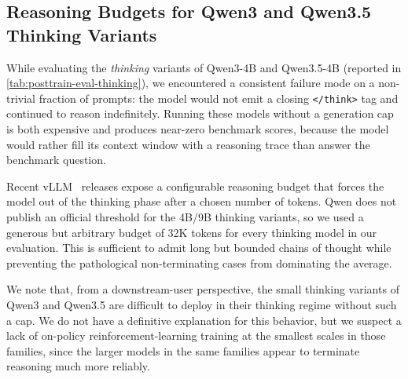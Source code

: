 \documentclass[11pt,a4paper]{article}
\begin{document}
\subsection{Reasoning Budgets for Qwen3 and Qwen3.5 Thinking Variants}
\label{app:qwen-thinking-budget}

While evaluating the \emph{thinking} variants of Qwen3-4B and Qwen3.5-4B
(reported in \cref{tab:posttrain-eval-thinking}), we encountered a
consistent failure mode on a non-trivial fraction of prompts: the model
would not emit a closing \texttt{</think>} tag and continued to reason
indefinitely. Running these models without a generation cap is both
expensive and produces near-zero benchmark scores, 
because the model would rather fill its context window with a reasoning trace 
than answer the benchmark question. 

Recent vLLM~\cite{kwon2023vllm} releases expose a configurable reasoning
budget that forces the model out of the thinking phase after a chosen
number of tokens. Qwen does not publish an official threshold for the
4B/9B thinking variants, so we used a generous but arbitrary budget of
32K tokens for every thinking model in our evaluation. This is sufficient
to admit long but bounded chains of thought while preventing the
pathological non-terminating cases from dominating the average.

We note that, from a downstream-user perspective, the small thinking
variants of Qwen3 and Qwen3.5 are difficult to deploy in their thinking
regime without such a cap. We do not have a definitive explanation for
this behavior, but we suspect a lack of on-policy reinforcement-learning
training at the smallest scales in those families, since the larger
models in the same families appear to terminate reasoning much more
reliably.
\end{document}
